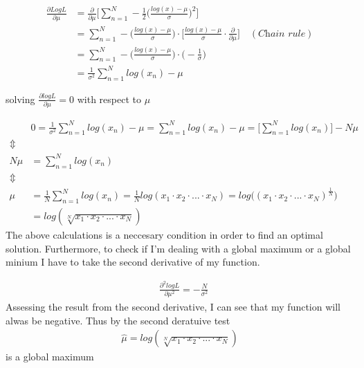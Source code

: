 \begin{align*}
    \frac{\partial Log L}{\partial \mu} & = \frac{\partial}{\partial \mu} \Bigg[ \sum_{n = 1}^{N} -\frac{1}{2} \Bigg( \frac{log(x) - \mu}{\sigma} \Bigg)^2 \Bigg] \\
                                        & = \sum_{n = 1}^{N} - \Bigg( \frac{log(x) - \mu}{\sigma} \Bigg) \cdot \Bigg[ \frac{log(x) - \mu}{\sigma} \cdot \frac{\partial}{\partial \mu} \Bigg] \quad (\textit{Chain rule}) \\
                                        & = \sum_{n = 1}^{N} - \Bigg( \frac{log(x) - \mu}{\sigma} \Bigg) \cdot \Bigg( - \frac{1}{\sigma}\Bigg) \\
                                        & = \frac{1}{\sigma^2} \sum_{n = 1}^{N} log(x_n) - \mu
\end{align*}

solving $ \frac{\partial logL}{\partial \mu} = 0 $ with respect to $\mu$

\begin{align*}
    & 0 = \frac{1}{\sigma^2} \sum_{n = 1}^{N} log(x_n) - \mu  = \sum_{n = 1}^{N} log(x_n) - \mu = \Bigg[ \sum_{n = 1}^{N} log(x_n)\Bigg] - N \mu\\
    \Updownarrow \\
    N \mu & = \sum_{n = 1}^{N} log(x_n) \\
    \Updownarrow \\
    \mu & = \frac{1}{N} \sum_{n = 1}^{N} log(x_n) = \frac{1}{N} log(x_1 \cdot x_2 \cdot ... \cdot x_N) = log \Bigg( (x_1 \cdot x_2 \cdot ... \cdot x_N)^{\frac{1}{N}}\Bigg) \\
    & = log(\sqrt[N]{x_1 \cdot x_2 \cdot ... \cdot x_N})
\end{align*}
The above calculations is a neccesary condition in order to find an optimal solution.
Furthermore, to check if I'm dealing with a global maximum or a global minium I have to take the second derivative of my function.

\begin{align*}
    & \frac{\partial^2 logL}{\partial \mu^2} =  - \frac{N}{\sigma^2}
\end{align*}
Assessing the result from the second derivative, I can see that my function will alwas be negative.
Thus by the second deratuive test
\begin{align*}
    \hat{\mu }= log(\sqrt[N]{x_1 \cdot x_2 \cdot ... \cdot x_N})
\end{align*}
is a global maximum



